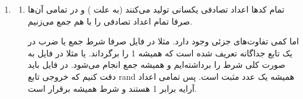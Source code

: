 \begin{enumerate}
    \item \begin{enumerate}
        \item تمام کد‌ها اعداد تصادفی یکسانی تولید می‌کنند (به علت )
        و در تمامی آن‌ها صرفا تمام اعداد تصادفی را با هم جمع می‌زنیم.

        اما کمی تفاوت‌های جزئی وجود دارد. مثلا در فایل
        صرفا شرط جمع یا ضرب در یک تابع جداگانه تعریف شده است که همیشه 1 را برگرداند. یا مثلا در فایل
        به صورت کلی شرط را برداشته‌ایم و همیشه جمع انجام می‌شود. در فایل
        باید دقت کنیم که خروجی تابع rand همیشه یک عدد مثبت است.
        پس تمامی اعداد آرایه برابر 1 هستند و شرط همیشه برقرار است.


\end{enumerate}
\end{enumerate}
